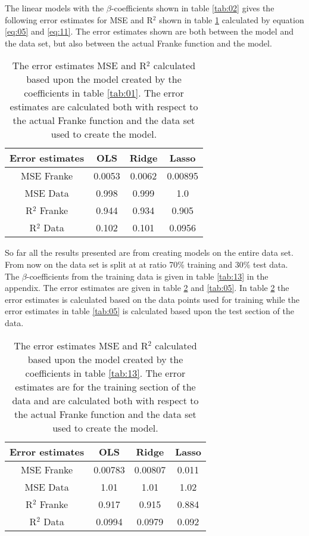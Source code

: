 \documentclass[uio,jmp,amsmath,amssymb,reprint,nofootinbib]{revtex4-1}
\numberwithin{equation}{section}
\begin{document}
The linear models with the \(\beta\)-coefficients shown in table \ref{tab:02} gives the following error estimates for MSE and R\(^2\) shown in table \ref{tab:03} calculated by equation \ref{eq:05} and \ref{eq:11}. The error estimates shown are both between the model and the data set, but also between the actual Franke function and the model.

\begin{table}
\begin{tabular}{|c|c|c|c|}\hline
Error estimates & OLS & Ridge & Lasso\\ \hline
MSE Franke & 0.0053 & 0.0062 & 0.00895 \\ \hline
MSE Data & 0.998 & 0.999 & 1.0 \\ \hline
R\(^2\) Franke & 0.944 & 0.934 & 0.905 \\ \hline
R\(^2\) Data & 0.102 & 0.101 & 0.0956 \\ \hline
\end{tabular}
\caption{The error estimates MSE and R\(^2\) calculated based upon the model created by the coefficients in table \ref{tab:01}. The error estimates are calculated both with respect to the actual Franke function and the data set used to create the model.}
\label{tab:03}
\end{table}

So far all the results presented are from creating models on the entire data set. From now on the data set is split at at ratio 70\% training and 30\% test data. The \(\beta\)-coefficients from the training data is given in table \ref{tab:13} in the appendix. The error estimates are given in table \ref{tab:04} and \ref{tab:05}. In table \ref{tab:04} the error estimates is calculated based on the data points used for training while the error estimates in table \ref{tab:05} is calculated based upon the test section of the data. 


\begin{table}
\begin{tabular}{|c|c|c|c|}\hline
Error estimates & OLS & Ridge & Lasso\\ \hline
MSE Franke & 0.00783 & 0.00807 & 0.011 \\ \hline
MSE Data & 1.01 & 1.01 & 1.02 \\ \hline
R\(^2\) Franke & 0.917 & 0.915 & 0.884 \\ \hline
R\(^2\) Data & 0.0994 & 0.0979 & 0.092 \\ \hline
\end{tabular}
\caption{The error estimates MSE and R\(^2\) calculated based upon the model created by the coefficients in table \ref{tab:13}. The error estimates are for the training section of the data and are calculated both with respect to the actual Franke function and the data set used to create the model.}
\label{tab:04}
\end{table}
\end{document}

